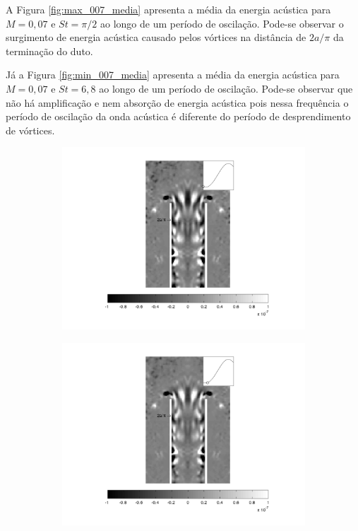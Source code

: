 A Figura \ref{fig:max_007_media} apresenta a média da energia acústica para $M = 0,07$ e $St = \pi/2$ ao longo de um período de oscilação. Pode-se observar o surgimento de energia acústica causado pelos vórtices na distância de $2a/\pi$ da terminação do duto.

Já a Figura \ref{fig:min_007_media} apresenta a média da energia acústica para $M = 0,07$ e $St = 6,8$ ao longo de um período de oscilação. Pode-se observar que não há amplificação e nem absorção de energia acústica pois nessa frequência o período de oscilação da onda acústica é diferente do período de desprendimento de vórtices. 



\begin{landscape}
\newpage
\vfill
\begin{figure}[ht!]
\begin{subfigure}{0.55 \textwidth}
  \includegraphics[width=1.\linewidth]{figuras/max_ka_007_1.png}
  \caption[]{}
  \label{fig:max_007_1}
\end{subfigure}
\begin{subfigure}{0.55 \textwidth}
  \includegraphics[width=1.\linewidth]{figuras/max_ka_007_2.png}

\end{subfigure}
\end{figure}
\end{landscape}
